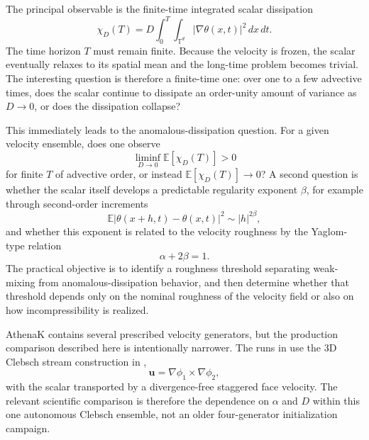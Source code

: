 \documentclass[11pt]{article}
\newcommand{\E}{\mathbb{E}}
\newcommand{\T}{\mathbb{T}}
\newcommand{\uu}{\mathbf{u}}
\begin{document}
The principal observable is the finite-time integrated scalar dissipation
\begin{equation}
\chi_D(T) = D\int_0^T\int_{\T^d} |\nabla\theta(x,t)|^2\,dx\,dt.
\label{eq:chi}
\end{equation}
The time horizon $T$ must remain finite. Because the velocity is frozen, the scalar eventually relaxes to its spatial mean and the long-time problem becomes trivial. The interesting question is therefore a finite-time one: over one to a few advective times, does the scalar continue to dissipate an order-unity amount of variance as $D\to 0$, or does the dissipation collapse?

This immediately leads to the anomalous-dissipation question. For a given velocity ensemble, does one observe
\begin{equation}
\liminf_{D\to 0}\E[\chi_D(T)]>0
\label{eq:anomalous}
\end{equation}
for finite $T$ of advective order, or instead $\E[\chi_D(T)]\to 0$? A second question is whether the scalar itself develops a predictable regularity exponent $\beta$, for example through second-order increments
\begin{equation}
\E|\theta(x+h,t)-\theta(x,t)|^2 \sim |h|^{2\beta},
\label{eq:theta-structure}
\end{equation}
and whether this exponent is related to the velocity roughness by the Yaglom-type relation
\begin{equation}
\alpha + 2\beta = 1.
\label{eq:yaglom}
\end{equation}
The practical objective is to identify a roughness threshold separating weak-mixing from anomalous-dissipation behavior, and then determine whether that threshold depends only on the nominal roughness of the velocity field or also on how incompressibility is realized.

AthenaK contains several prescribed velocity generators, but the production comparison described here is intentionally narrower. The runs in
use the 3D Clebsch stream construction in ,
\begin{equation}
\uu=\nabla\phi_1\times\nabla\phi_2,
\end{equation}
with the scalar transported by a divergence-free staggered face velocity. The relevant scientific comparison is therefore the dependence on $\alpha$ and $D$ within this one autonomous Clebsch ensemble, not an older four-generator initialization campaign.
\end{document}
